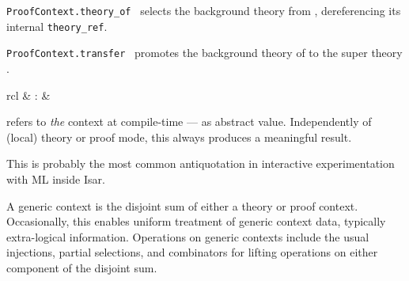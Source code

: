 \begin{isabellebody}
\begin{isamarkuptext}
\begin{description}
  \item \verb|ProofContext.theory_of|~ selects the
  background theory from , dereferencing its internal
  \verb|theory_ref|.

  \item \verb|ProofContext.transfer|~ promotes the
  background theory of  to the super theory .

  \end{description}%
\end{isamarkuptext}%
\isamarkuptrue%
%
\endisatagmlref
{\isafoldmlref}%
%
\isadelimmlref
%
\endisadelimmlref
%
\isadelimmlantiq
%
\endisadelimmlantiq
%
\isatagmlantiq
%
\begin{isamarkuptext}%
\begin{matharray}{rcl}
  \hypertarget{ML antiquotation.context}{\hyperlink{ML antiquotation.context}{\mbox{}}} & : &  \\
  \end{matharray}

  \begin{description}

  \item {} refers to \emph{the} context at
  compile-time --- as abstract value.  Independently of (local) theory
  or proof mode, this always produces a meaningful result.

  This is probably the most common antiquotation in interactive
  experimentation with ML inside Isar.

  \end{description}%
\end{isamarkuptext}%
\isamarkuptrue%
%
\endisatagmlantiq
{\isafoldmlantiq}%
%
\isadelimmlantiq
%
\endisadelimmlantiq
%
\isamarkuptrue%
%
\begin{isamarkuptext}%
A generic context is the disjoint sum of either a theory or proof
  context.  Occasionally, this enables uniform treatment of generic
  context data, typically extra-logical information.  Operations on
  generic contexts include the usual injections, partial selections,
  and combinators for lifting operations on either component of the
  disjoint sum.


\end{isamarkuptext}
\end{isabellebody}
